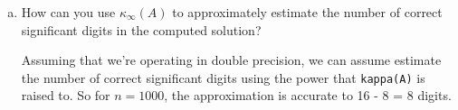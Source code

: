 \documentclass[10pt,letterpaper]{article}
\begin{document}
\begin{enumerate}[(a)]
\color{TangGreen}
No it is not, given that the values of {\tt kappa(A)} are usually a few magnitudes off.
\color{black}

\item How can you use $\kappa_{\infty}(A)$ to approximately estimate the number of correct significant digits in the computed solution?

\color{TangGreen}
Assuming that we're operating in double precision, we can assume estimate the number of correct significant digits using the power that {\tt kappa(A)} is raised to. So for $n = 1000$, the approximation is accurate to 16 - 8 = 8 digits. 
\color{black}

\end{enumerate}
\end{document}
